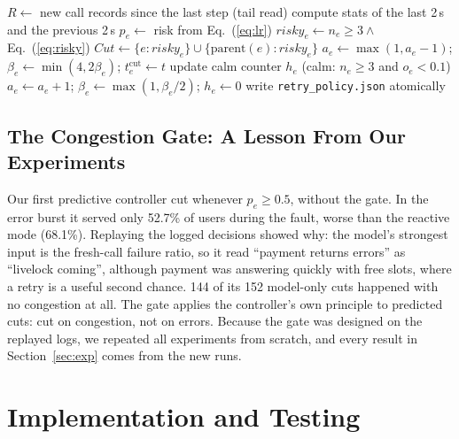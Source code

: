 \documentclass[conference,a4paper]{IEEEtran}
\begin{document}
\begin{algorithm}[!t]
\caption{One Control Step (Every 1 s)}
\label{alg:ctrl}
\begin{algorithmic}[1]
\State $R \gets$ new call records since the last step (tail read)
  \State compute stats of the last 2\,s and the previous 2\,s
  \State $p_e \gets$ risk from Eq.~(\ref{eq:lr}) 
  \State $\textit{risky}_e \gets n_e \ge 3 \wedge$ Eq.~(\ref{eq:risky})
\EndFor
\State $\textit{Cut} \gets \{e : \textit{risky}_e\} \cup \{\text{parent}(e) : \textit{risky}_e\}$
    \State $a_e \gets \max(1, a_e - 1)$;\; $\beta_e \gets \min(4, 2\beta_e)$;\; $t^{\text{cut}}_e \gets t$
    \State update calm counter $h_e$ (calm: $n_e \ge 3$ and $o_e < 0.1$)
      \State $a_e \gets a_e + 1$;\; $\beta_e \gets \max(1, \beta_e/2)$;\; $h_e \gets 0$
    \EndIf
  \EndIf
\EndFor
{} \State write \texttt{retry\_policy.json} atomically \EndIf
\end{algorithmic}
\end{algorithm}

\subsection{The Congestion Gate: A Lesson From Our Experiments}
Our first predictive controller cut whenever $p_e \ge 0.5$, without the gate. In the error burst it served only 52.7\% of users during the fault, worse than the reactive mode (68.1\%). Replaying the logged decisions showed why: the model's strongest input is the fresh-call failure ratio, so it read ``payment returns errors'' as ``livelock coming'', although payment was answering quickly with free slots, where a retry is a useful second chance. 144 of its 152 model-only cuts happened with no congestion at all. The gate applies the controller's own principle to predicted cuts: cut on congestion, not on errors. Because the gate was designed on the replayed logs, we repeated all experiments from scratch, and every result in Section~\ref{sec:exp} comes from the new runs.

\section{Implementation and Testing}
\label{sec:impl}
\end{document}
